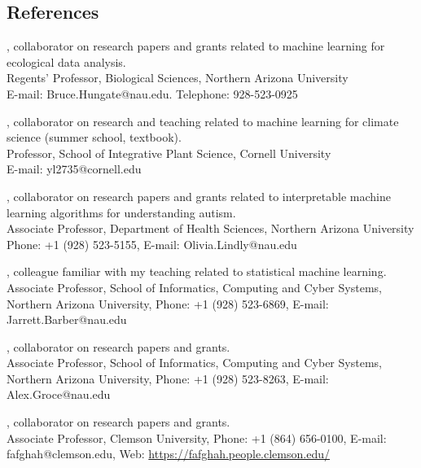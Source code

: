 \documentclass[margin,line]{res}
\begin{document}
\begin{resume}

\section{\sc References}
 
, collaborator on research papers and grants related to machine learning for ecological data analysis. \\
Regents' Professor, Biological Sciences, Northern Arizona University\\
E-mail: Bruce.Hungate@nau.edu. Telephone: 928-523-0925

, collaborator on research and teaching related to machine learning for climate science (summer school, textbook).\\
Professor, School of Integrative Plant Science, Cornell University\\
E-mail: yl2735@cornell.edu

, collaborator on research papers and grants related to interpretable machine learning algorithms for understanding autism.\\
Associate Professor, Department of Health Sciences, Northern Arizona University\\
Phone: +1 (928) 523-5155, E-mail: Olivia.Lindly@nau.edu

, colleague familiar with my teaching related to statistical machine learning.\\
Associate Professor, School of Informatics, Computing and Cyber Systems,\\
Northern Arizona University, 
Phone: +1 (928) 523-6869, E-mail: Jarrett.Barber@nau.edu

, collaborator on research papers and grants.\\
Associate Professor, School of Informatics, Computing and Cyber Systems,\\
Northern Arizona University, 
Phone: +1 (928) 523-8263, E-mail: Alex.Groce@nau.edu

, collaborator on research papers and grants.\\
Associate Professor, Clemson University, Phone: +1 (864) 656-0100, E-mail: fafghah@clemson.edu, Web: \url{https://fafghah.people.clemson.edu/}


\end{resume}
\end{document}
